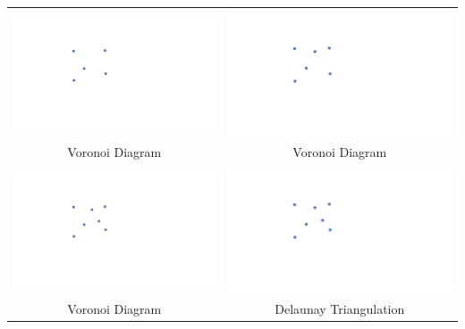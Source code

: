 \documentclass[a4paper,12pt]{article}
\begin{document}
\begin{tabular}{|c|c|}
\hline
\hspace{10pt}\includegraphics[width=0.425\linewidth]{../images/voronoi5.pdf}\hspace{10pt} & \hspace{10pt}\includegraphics[width=0.425\linewidth]{../images/voronoi6.pdf}\hspace{10pt} \\
Voronoi Diagram & Voronoi Diagram \\
\hline
\hspace{10pt}\includegraphics[width=0.425\linewidth]{../images/voronoi7.pdf}\hspace{10pt} & \hspace{10pt}\includegraphics[width=0.425\linewidth]{../images/voronoi7.pdf}\hspace{10pt} \\
Voronoi Diagram & Delaunay Triangulation \\
\hline
\end{tabular}
\end{document}
